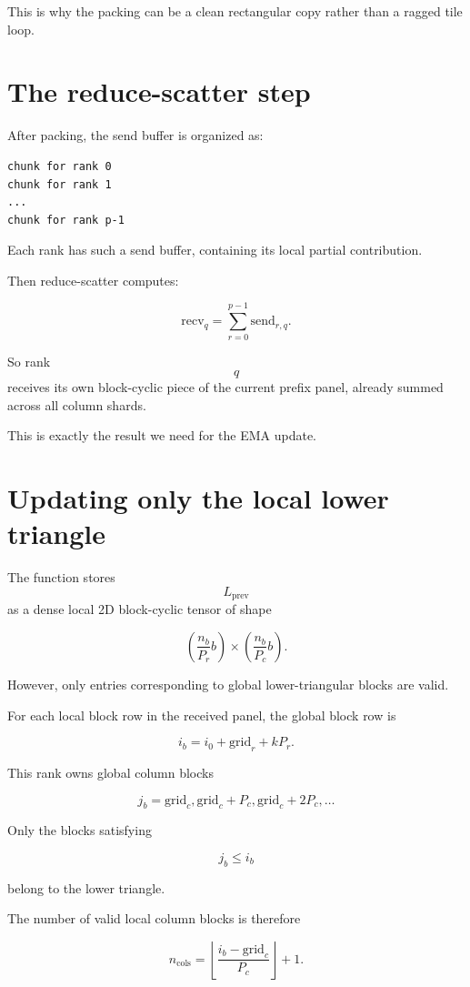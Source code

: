 \documentclass[11pt]{article}
\begin{document}
This is why the packing can be a clean rectangular copy rather than a ragged tile loop.

\section{The reduce-scatter step}

After packing, the send buffer is organized as:

\begin{lstlisting}
chunk for rank 0
chunk for rank 1
...
chunk for rank p-1
\end{lstlisting}

Each rank has such a send buffer, containing its local partial contribution.

Then reduce-scatter computes:

$$
\text{recv}_q
=
\sum_{r=0}^{p-1}
\text{send}_{r,q}.
$$

So rank $$q$$ receives its own block-cyclic piece of the current prefix panel, already summed across all column shards.

This is exactly the result we need for the EMA update.

\section{Updating only the local lower triangle}

The function stores $$L_{\text{prev}}$$ as a dense local 2D block-cyclic tensor of shape

$$
\left(\frac{n_b}{P_r}b\right)
\times
\left(\frac{n_b}{P_c}b\right).
$$

However, only entries corresponding to global lower-triangular blocks are valid.

For each local block row in the received panel, the global block row is

$$
i_b = i_0 + \text{grid}_r + kP_r.
$$

This rank owns global column blocks

$$
j_b = \text{grid}_c,
\text{grid}_c + P_c,
\text{grid}_c + 2P_c,
\ldots
$$

Only the blocks satisfying

$$
j_b \leq i_b
$$

belong to the lower triangle.

The number of valid local column blocks is therefore

$$
n_{\text{cols}}
=
\left\lfloor
\frac{i_b - \text{grid}_c}{P_c}
\right\rfloor
+ 1.
$$
\end{document}
